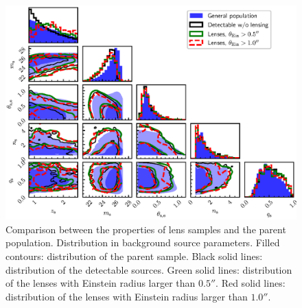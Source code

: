 \documentclass{aa}
\begin{document}
\begin{figure}
\includegraphics[width=\textwidth]{source_cornerplot.eps}
\caption{
Comparison between the properties of lens samples and the parent population. Distribution in background source parameters.
Filled contours: distribution of the parent sample.
Black solid lines: distribution of the detectable sources.
Green solid lines: distribution of the lenses with Einstein radius larger than $0.5''$.
Red solid lines: distribution of the lenses with Einstein radius larger than $1.0''$.
\label{fig:sourcepars}
}
\end{figure}
\end{document}
